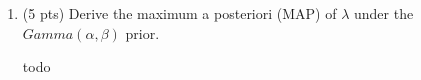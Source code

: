 \documentclass[11pt]{article}
\begin{document}
\begin{enumerate}
\begin{answertext}{6cm}{}
\end{answertext} 



    \item (5 pts) Derive the maximum a posteriori (MAP) of \(\lambda\) under the \(Gamma\left(\alpha, \beta\right)\) prior. \\
\begin{answertext}{6cm}{}

todo

\end{answertext} 

\end{enumerate}
\end{document}
